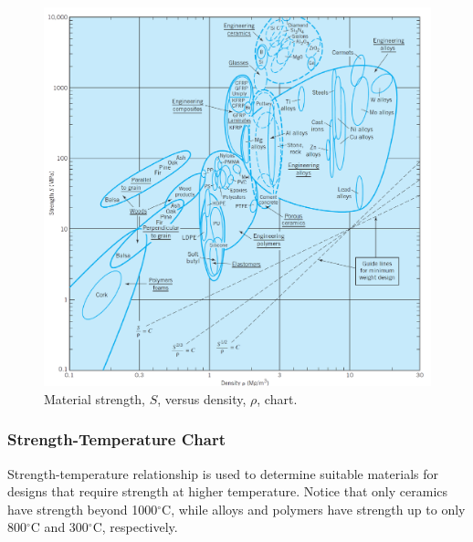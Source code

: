 \documentclass[
10pt,
a4paper,
openany,
svgnames,
]{book}
\begin{document}
\begin{figure}[h]
  \centering
  \includegraphics[scale=0.82]{pictures/Material-selection/strength-density-diagram}
  \caption{Material strength, $S$, versus density, $\rho$, chart. \cite{ashby2010materials}}
  \label{fig: strength density diagram}
\end{figure}

\subsubsection{Strength-Temperature Chart}

Strength-temperature relationship is used to determine suitable materials for designs that require strength at higher temperature. Notice that only ceramics have strength beyond 1000$^{\circ}$C, while alloys and polymers have strength up to only 800$^{\circ}$C and 300$^{\circ}$C, respectively.
\end{document}
